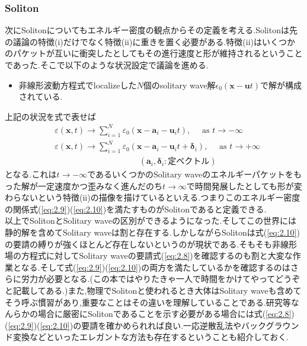 \documentclass[dvipdfmx,11pt,a4paper,oneside,openany]{jsbook}
\begin{document}
\subsubsection{Soliton}
次にSolitonについてもエネルギー密度の観点からその定義を考える.Solitonは先の議論の特徴(i)だけでなく特徴(ii)に重きを置く必要がある.特徴(ii)はいくつかのパケットが互いに衝突したとしてもその進行速度と形が維持されるということであった.そこで以下のような状況設定で議論を進める.
\begin{itemize}
    \item 非線形波動方程式でlocalizeした$N$個のsolitary wave解$\epsilon_0(\bm{x}-\bm{u}t)$で解が構成されている.
\end{itemize}
上記の状況を式で表せば
\begin{align}
     & \varepsilon(\bm{x}, t) \rightarrow \sum_{i=1}^{N} \varepsilon_{0}\left(\bm{x}-\bm{a}_{i}-\bm{u}_{i} t\right), \quad \text { as } t \rightarrow-\infty\label{eq:2.9}                  \\
     & \varepsilon(\bm{x}, t) \rightarrow \sum_{i=1}^{N} \varepsilon_{0}\left(\bm{x}-\bm{a}_{i}-\bm{u}_{i} t+\bm{\delta}_{i}\right), \quad \text { as } t \rightarrow+\infty\label{eq:2.10} \\
     & \qquad \ \ \ \ \ \ \ \ \ \ \ \ \ \ \ \ \ \ \ \ \  \ \ \ \ \ \ \ \ \ \ \ \ \ \ \ \ (\bm{a}_i,\bm{\delta}_i:\text{定ベクトル})\nonumber
\end{align}
となる.これは$t\rightarrow -\infty$であるいくつかのSolitary waveのエネルギーパケットをもった解が一定速度かつ歪みなく進んだのち$t\rightarrow \infty$で時間発展したとしても形が変わらないという特徴(ii)の描像を描けているといえる.つまりこのエネルギー密度の関係式(\ref{eq:2.9})(\ref{eq:2.10})を満たすものがSolitonであると定義できる.\\

以上でSolitonとSolitary waveの区別ができるようになった.そしてこの世界には静的解を含めてSolitary waveは割と存在する.しかしながらSolitonは式(\ref{eq:2.10})の要請の縛りが強くほとんど存在しないというのが現状である.そもそも非線形場の方程式に対してSolitary waveの要請式(\ref{eq:2.8})を確認するのも割と大変な作業となる.そして式(\ref{eq:2.9})(\ref{eq:2.10})の両方を満たしているかを確認するのはさらに労力が必要となる.(この本ではやりたきゃ一人で時間をかけてやってどうぞと記載してある.)また,物理でSolitonと使われるとき大体はSolitary waveも含めてそう呼ぶ慣習があり,重要なことはその違いを理解していることである.研究等なんらかの場合に厳密にSolitonであることを示す必要がある場合には式(\ref{eq:2.8})(\ref{eq:2.9})(\ref{eq:2.10})の要請を確かめられれば良い.一応逆散乱法やバックグラウンド変換などといったエレガントな方法も存在するということも紹介しておく.
\end{document}
